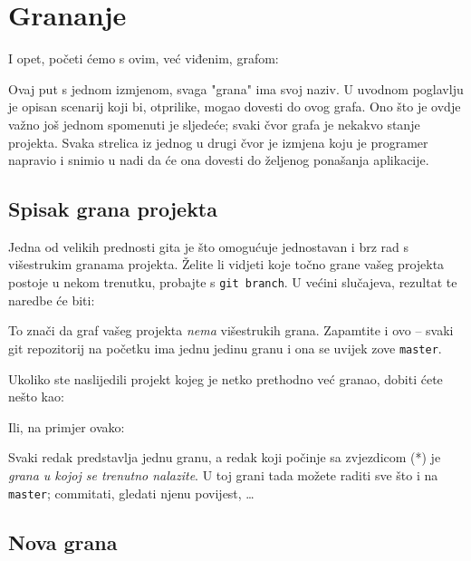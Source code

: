 \chapter*{Grananje}

I opet, početi ćemo s ovim, već viđenim, grafom:



Ovaj put s jednom izmjenom, svaga "grana" ima svoj naziv.
U uvodnom poglavlju je opisan scenarij koji bi, otprilike, mogao dovesti do ovog grafa.
Ono što je ovdje važno još jednom spomenuti je sljedeće; svaki čvor grafa je nekakvo stanje projekta. 
Svaka strelica iz jednog u drugi čvor je izmjena koju je programer napravio i snimio u nadi da će ona dovesti do željenog ponašanja aplikacije.

\section*{Spisak grana projekta}

Jedna od velikih prednosti gita je što omogućuje jednostavan i brz rad s višestrukim granama projekta.
Želite li vidjeti koje točno grane vašeg projekta postoje u nekom trenutku, probajte s \verb+git branch+.
U većini slučajeva, rezultat te naredbe će biti:



To znači da graf vašeg projekta \emph{nema} višestrukih grana. 
Zapamtite i ovo -- svaki git repozitorij na početku ima jednu jedinu granu i ona se uvijek zove \verb+master+.

Ukoliko ste naslijedili projekt kojeg je netko prethodno već granao, dobiti ćete nešto kao:



Ili, na primjer ovako:



Svaki redak predstavlja jednu granu, a redak koji počinje sa zvjezdicom (*) je \emph{grana u kojoj se trenutno nalazite}.
U toj grani tada možete raditi sve što i na \verb+master+; commitati, gledati njenu povijest, \dots

\section*{Nova grana}

